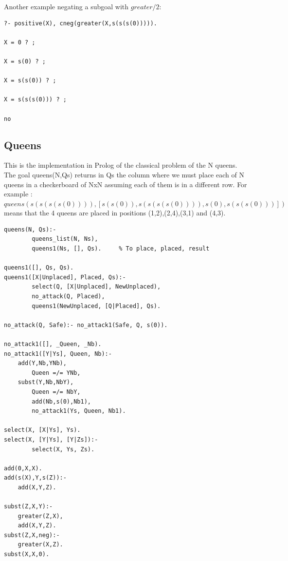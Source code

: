 \documentclass{tlp}
\begin{document}
Another example negating a subgoal with $greater/2$:
\begin{small}
\begin{verbatim}
?- positive(X), cneg(greater(X,s(s(s(0))))).

X = 0 ? ;

X = s(0) ? ;

X = s(s(0)) ? ;

X = s(s(s(0))) ? ;

no
\end{verbatim}
\end{small}

\subsection*{Queens}

This is the implementation in Prolog of the classical problem of the N
queens. The goal queens(N,Qs) returns in Qs the column where we must place
each of N queens in a checkerboard of NxN assuming each of them is in a
different row. For example :
$queens(s(s(s(s(0)))),[s(s(0)),s(s(s(s(0)))),s(0),s(s(s(0)))])$ means that the
4 queens are placed in positions (1,2),(2,4),(3,1) and (4,3).

\begin{small}
\begin{verbatim}
queens(N, Qs):-
        queens_list(N, Ns),
        queens1(Ns, [], Qs).     % To place, placed, result

queens1([], Qs, Qs).
queens1([X|Unplaced], Placed, Qs):-
        select(Q, [X|Unplaced], NewUnplaced),
        no_attack(Q, Placed),
        queens1(NewUnplaced, [Q|Placed], Qs).
 
no_attack(Q, Safe):- no_attack1(Safe, Q, s(0)). 
 
no_attack1([], _Queen, _Nb).
no_attack1([Y|Ys], Queen, Nb):-
	add(Y,Nb,YNb),
        Queen =/= YNb,
 	subst(Y,Nb,NbY),
        Queen =/= NbY,
        add(Nb,s(0),Nb1),
        no_attack1(Ys, Queen, Nb1).

select(X, [X|Ys], Ys).
select(X, [Y|Ys], [Y|Zs]):-
        select(X, Ys, Zs).

add(0,X,X).
add(s(X),Y,s(Z)):-
	add(X,Y,Z).

subst(Z,X,Y):-
	greater(Z,X),
	add(X,Y,Z).
subst(Z,X,neg):-
	greater(X,Z).
subst(X,X,0).
\end{verbatim}
\end{small}
\end{document}

